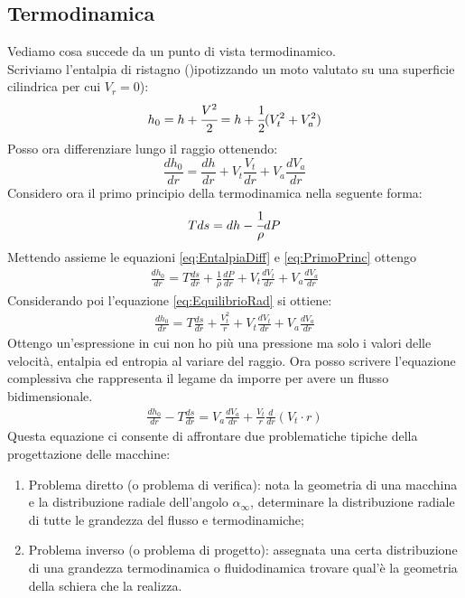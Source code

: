 \subsection{Termodinamica}
Vediamo cosa succede da un punto di vista termodinamico.\\ Scriviamo l'entalpia di ristagno ()ipotizzando un moto valutato su una superficie cilindrica per cui $V_r = 0$):
\begin{align*}
h_0 = h + \cfrac{V^2}{2} = h + \cfrac{1}{2}(V_t^2 + V_a^2)
\end{align*}
Posso ora differenziare lungo il raggio ottenendo:
\begin{equation}
\frac{dh_0}{dr} = \frac{dh}{dr} + V_t \frac{V_t}{dr} + V_a \frac{dV_a}{dr}
\label{eq:EntalpiaDiff}
\end{equation}
Considero ora il primo principio della termodinamica nella seguente forma:
\begin{equation}
Tds = dh - \cfrac{1}{\rho} dP
\label{eq:PrimoPrinc}
\end{equation}
Mettendo assieme le equazioni \ref{eq:EntalpiaDiff} e \ref{eq:PrimoPrinc} ottengo
\begin{align*}
\frac{dh_0}{dr} = T \frac{ds}{dr} + \frac{1}{\rho} \frac{dP}{dr} + V_t \frac{dV_t}{dr} + V_a \frac{dV_a}{dr}
\end{align*}
Considerando poi l'equazione \ref{eq:EquilibrioRad} si ottiene:
\begin{align*}
\frac{dh_0}{dr} = T \frac{ds}{dr} + \frac{V_t^2}{r} + V_t \frac{dV_t}{dr} + V_a \frac{dV_a}{dr}
\end{align*}
Ottengo un'espressione in cui non ho più una pressione ma solo i valori delle velocità, entalpia ed entropia al variare del raggio.
Ora posso scrivere l'equazione complessiva che rappresenta il legame da imporre per avere un flusso bidimensionale.
\begin{align*}
\boxed{ \frac{dh_0}{dr} - T\frac{ds}{dr} = V_a \frac{dV_a}{dr} + \frac{V_t}{r} \frac{d}{dr}(V_t \cdot r)}
\end{align*}
Questa equazione ci consente di affrontare due problematiche tipiche della progettazione delle macchine:
\begin{enumerate}
\item Problema diretto (o problema di verifica): nota la geometria di una macchina e la distribuzione radiale dell'angolo $\alpha_{\infty}$, determinare la distribuzione radiale di tutte le grandezza del flusso e termodinamiche;
\item Problema inverso (o problema di progetto): assegnata una certa distribuzione di una grandezza termodinamica o fluidodinamica trovare qual'è la geometria della schiera che la realizza.
\end{enumerate}
